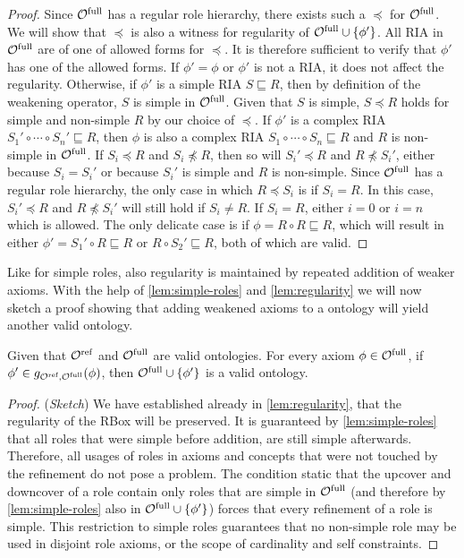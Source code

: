 \documentclass[
]{ceurart}
\begin{document}
\begin{proof}
  Since ${\mathcal{O}^\textnormal{full}}$ has a regular role hierarchy, there exists such a $\preceq$ for ${\mathcal{O}^\textnormal{full}}$. We will show that $\preceq$ is also a witness for regularity of ${\mathcal{O}^\textnormal{full}} \cup \{ \phi' \}$. All RIA in ${\mathcal{O}^\textnormal{full}}$ are of one of allowed forms for $\preceq$. It is therefore sufficient to verify that $\phi'$ has one of the allowed forms.
  If $\phi' = \phi$ or $\phi'$ is not a RIA, it does not affect the regularity.
  Otherwise, if $\phi'$ is a simple RIA $S \sqsubseteq R$, then by definition of the weakening operator, $S$ is simple in ${\mathcal{O}^\textnormal{full}}$. Given that $S$ is simple, $S \preceq R$ holds for simple and non-simple $R$ by our choice of $\preceq$.
  If $\phi'$ is a complex RIA $S_1' \circ \cdots \circ S_n' \sqsubseteq R$, then $\phi$ is also a complex RIA $S_1 \circ \cdots \circ S_n \sqsubseteq R$ and $R$ is non-simple in ${\mathcal{O}^\textnormal{full}}$. If $S_i \preceq R$ and $S_i \not\preceq R$, then so will $S_i' \preceq R$ and $R \not\preceq S_i'$, either because $S_i = S_i'$ or because $S_i'$ is simple and $R$ is non-simple. Since ${\mathcal{O}^\textnormal{full}}$ has a regular role hierarchy, the only case in which $R \preceq S_i$ is if $S_i = R$. In this case, $S_i' \preceq R$ and $R \not\preceq S_i'$ will still hold if $S_i \not= R$. If $S_i = R$, either $i = 0$ or $i = n$ which is allowed. The only delicate case is if $\phi = R \circ R \sqsubseteq R$, which will result in either $\phi' = S_1' \circ R \sqsubseteq R$ or $R \circ S_2' \sqsubseteq R$, both of which are valid.
\end{proof}

Like for simple roles, also regularity is maintained by repeated addition of weaker axioms. With the help of \cref{lem:simple-roles} and \cref{lem:regularity} we will now sketch a proof showing that adding weakened axioms to a \SROIQ ontology will yield another valid \SROIQ ontology.

\begin{lemma} \label{lem:global-constraints}
  Given that ${\mathcal{O}^\textnormal{ref}}$ and ${\mathcal{O}^\textnormal{full}}$ are valid \SROIQ ontologies. For every axiom $\phi \in {\mathcal{O}^\textnormal{full}}$, if $\phi' \in g_{{\mathcal{O}^\textnormal{ref}},{\mathcal{O}^\textnormal{full}}}(\phi)$, then ${\mathcal{O}^\textnormal{full}} \cup \{ \phi' \}$ is a valid \SROIQ ontology.
\end{lemma}

\begin{proof}(\emph{Sketch})
  We have established already in \cref{lem:regularity}, that the regularity of the RBox will be preserved.
  It is guaranteed by \cref{lem:simple-roles} that all roles that were simple before addition, are still simple afterwards. Therefore, all usages of roles in axioms and concepts that were not touched by the refinement do not pose a problem. The condition static that the upcover and downcover of a role contain only roles that are simple in ${\mathcal{O}^\textnormal{full}}$ (and therefore by \cref{lem:simple-roles} also in ${\mathcal{O}^\textnormal{full}} \cup \{ \phi' \}$) forces that every refinement of a role is simple. This restriction to simple roles guarantees that no non-simple role may be used in disjoint role axioms, or the scope of cardinality and self constraints.
\end{proof}
\end{document}
